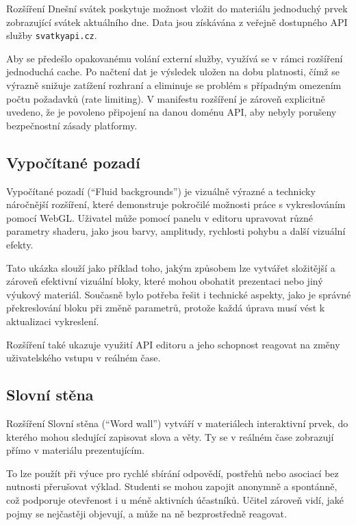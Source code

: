 Rozšíření Dnešní svátek poskytuje možnost vložit do materiálu jednoduchý prvek zobrazující svátek aktuálního dne. 
Data jsou získávána z veřejně dostupného API služby \texttt{svatkyapi.cz}.

Aby se předešlo opakovanému volání externí služby, využívá se v rámci rozšíření jednoduchá cache. 
Po načtení dat je výsledek uložen na dobu platnosti, čímž se výrazně snižuje zatížení rozhraní a eliminuje se problém s případným omezením počtu požadavků (rate limiting).
V manifestu rozšíření je zároveň explicitně uvedeno, že je povoleno připojení na danou doménu API, aby nebyly porušeny bezpečnostní zásady platformy.

\subsection{Vypočítané pozadí}

Vypočítané pozadí (\enquote{Fluid backgrounds}) je vizuálně výrazné a technicky náročnější rozšíření, které demonstruje pokročilé možnosti práce s vykreslováním pomocí WebGL.
Uživatel může pomocí panelu v editoru upravovat různé parametry shaderu, jako jsou barvy, amplitudy, rychlosti pohybu a další vizuální efekty.

Tato ukázka slouží jako příklad toho, jakým způsobem lze vytvářet složitější a zároveň efektivní vizuální bloky, které mohou obohatit prezentaci nebo jiný výukový materiál. 
Současně bylo potřeba řešit i technické aspekty, jako je správné překreslování bloku při změně parametrů, protože každá úprava musí vést k aktualizaci vykreslení.

Rozšíření také ukazuje využití API editoru a jeho schopnost reagovat na změny uživatelského vstupu v reálném čase.

\subsection{Slovní stěna}


Rozšíření Slovní stěna (\enquote{Word wall}) vytváří v materiálech interaktivní prvek, do kterého mohou sledující zapisovat slova a věty. 
Ty se v reálném čase zobrazují přímo v materiálu prezentujícím.

To lze použít při výuce pro rychlé sbírání odpovědí, postřehů nebo asociací bez nutnosti přerušovat výklad. 
Studenti se mohou zapojit anonymně a spontánně, což podporuje otevřenost i u méně aktivních účastníků. 
Učitel zároveň vidí, jaké pojmy se nejčastěji objevují, a může na ně bezprostředně reagovat.

